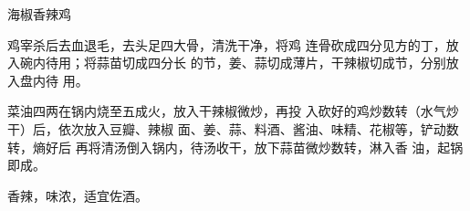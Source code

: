 \begin{recipe}[钢铁仔鸡]{海椒香辣鸡}



\ingredients


\cooking

\step 	鸡宰杀后去血退毛，去头足四大骨，清洗干净，将鸡 连骨砍成四分见方的丁，放入碗内待用；将蒜苗切成四分长 的节，姜、蒜切成薄片，干辣椒切成节，分别放入盘内待 用。

\step 	菜油四两在锅内烧至五成火，放入干辣椒微炒，再投 入砍好的鸡炒数转（水气炒干）后，依次放入豆瓣、辣椒 面、姜、蒜、料酒、酱油、味精、花椒等，铲动数转，熵好后 再将清汤倒入锅内，待汤收干，放下蒜苗微炒数转，淋入香 油，起锅即成。

\notes

香辣，味浓，适宜佐酒。

\end{recipe}

